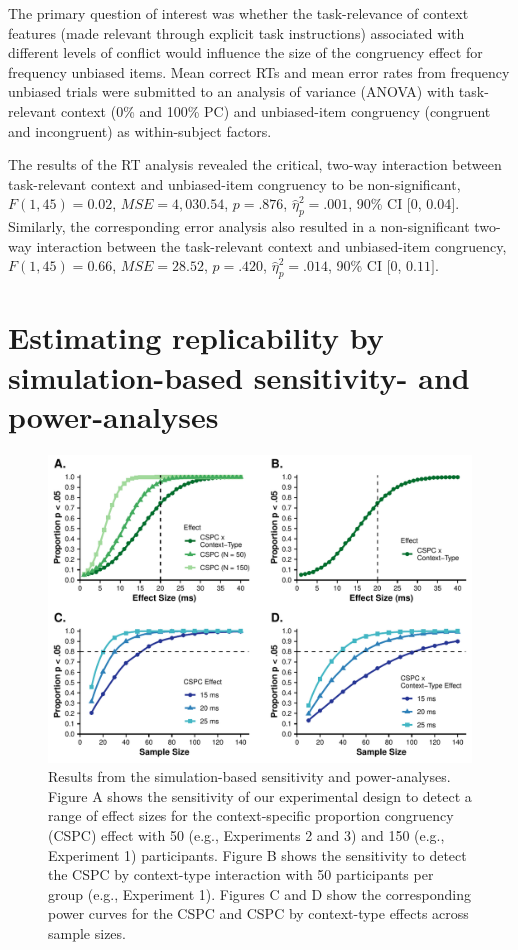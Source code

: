\documentclass[english,,man,floatsintext]{apa6}
\begin{document}
The primary question of interest was whether the task-relevance of context features (made relevant through explicit task instructions) associated with different levels of conflict would influence the size of the congruency effect for frequency unbiased items. Mean correct RTs and mean error rates from frequency unbiased trials were submitted to an analysis of variance (ANOVA) with task-relevant context (0\% and 100\% PC) and unbiased-item congruency (congruent and incongruent) as within-subject factors.

The results of the RT analysis revealed the critical, two-way interaction between task-relevant context and unbiased-item congruency to be non-significant, \(F(1, 45) = 0.02\), \(\mathit{MSE} = 4,030.54\), \(p = .876\), \(\hat{\eta}^2_p = .001\), 90\% CI \([0\), \(0.04]\). Similarly, the corresponding error analysis also resulted in a non-significant two-way interaction between the task-relevant context and unbiased-item congruency, \(F(1, 45) = 0.66\), \(\mathit{MSE} = 28.52\), \(p = .420\), \(\hat{\eta}^2_p = .014\), 90\% CI \([0\), \(0.11]\).

\hypertarget{estimating-replicability-by-simulation-based-sensitivity--and-power-analyses}{%
\section{Estimating replicability by simulation-based sensitivity- and power-analyses}\label{estimating-replicability-by-simulation-based-sensitivity--and-power-analyses}}

\begin{figure}
\centering
\includegraphics{manuscript_pretty_files/figure-latex/figure5-1.pdf}
\caption{\label{fig:figure5}Results from the simulation-based sensitivity and power-analyses. Figure A shows the sensitivity of our experimental design to detect a range of effect sizes for the context-specific proportion congruency (CSPC) effect with 50 (e.g., Experiments 2 and 3) and 150 (e.g., Experiment 1) participants. Figure B shows the sensitivity to detect the CSPC by context-type interaction with 50 participants per group (e.g., Experiment 1). Figures C and D show the corresponding power curves for the CSPC and CSPC by context-type effects across sample sizes.}
\end{figure}
\end{document}
